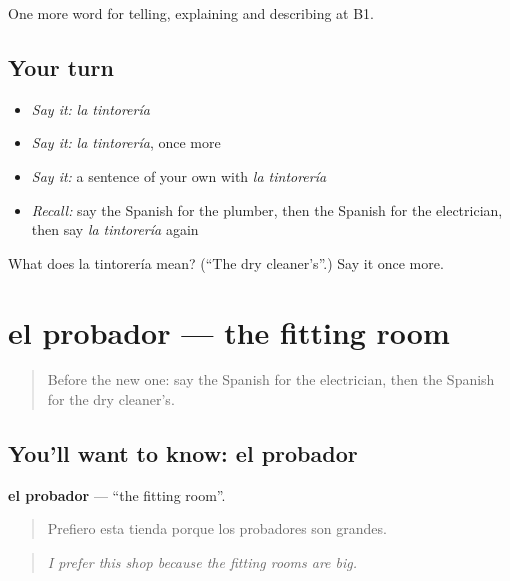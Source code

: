 \begin{grammarlens}[title={What you've built}]
One more word for telling, explaining and describing at B1.
\end{grammarlens}

\subsection*{Your turn}
\begin{itemize}
\raggedright
  \item \emph{Say it:} \emph{la tintorería}
  \item \emph{Say it:} \emph{la tintorería}, once more
  \item \emph{Say it:} a sentence of your own with \emph{la tintorería}
  \item \emph{Recall:} say the Spanish for the plumber, then the Spanish for the electrician, then say \emph{la tintorería} again
\end{itemize}

\begin{tcolorbox}[breakable,colback=teal!4,colframe=teal!35!black,title={Before you move on}]
What does la tintorería mean? (\textquotedblleft{}The dry cleaner's\textquotedblright{}.) Say it once more.
\end{tcolorbox}
\section[el probador]{el probador — the fitting room}

\label{lesson:ES-C770-probador}



\begin{quote}
Before the new one: say the Spanish for the electrician, then the Spanish for the dry cleaner's.
\end{quote}

\subsection*{You'll want to know: el probador}
\textbf{el probador} — \textquotedblleft{}the fitting room\textquotedblright{}.

\begin{quote}
Prefiero esta tienda porque los probadores son grandes.
\end{quote}

\begin{quote}
\emph{I prefer this shop because the fitting rooms are big.}
\end{quote}

